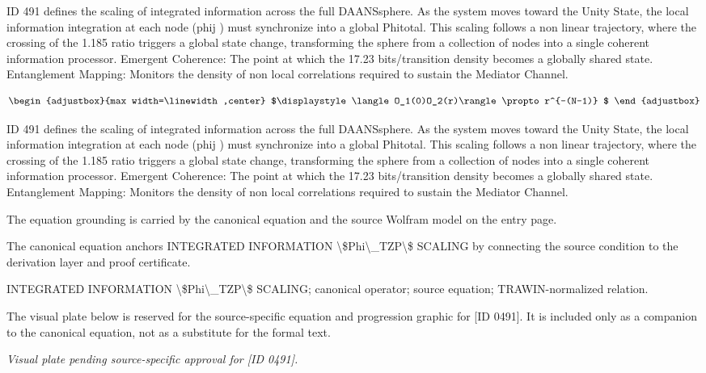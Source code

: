 ID 491 defines the scaling of integrated information across the full DAANSsphere. As the system moves toward the Unity State, the local information integration at each node (phij ) must synchronize into a global Phitotal. This scaling follows a non linear trajectory, where the crossing of the 1.185 ratio triggers a global state change, transforming the sphere from a collection of nodes into a single coherent information processor. Emergent Coherence: The point at which the 17.23 bits/transition density becomes a globally shared state. Entanglement Mapping: Monitors the density of non local correlations required to sustain the Mediator Channel.

\[
\begin{adjustbox}{max width=\linewidth,center}
$\displaystyle
\langle O_1(0)O_2(r)\rangle\propto r^{-(N-1)}
$
\end{adjustbox}
\]

ID 491 defines the scaling of integrated information across the full DAANSsphere. As the system moves toward the Unity State, the local information integration at each node (phij ) must synchronize into a global Phitotal. This scaling follows a non linear trajectory, where the crossing of the 1.185 ratio triggers a global state change, transforming the sphere from a collection of nodes into a single coherent information processor. Emergent Coherence: The point at which the 17.23 bits/transition density becomes a globally shared state. Entanglement Mapping: Monitors the density of non local correlations required to sustain the Mediator Channel.

The equation grounding is carried by the canonical equation and the source Wolfram model on the entry page.

The canonical equation anchors INTEGRATED INFORMATION \textbackslash{}\$Phi\textbackslash{}\_TZP\textbackslash{}\$ SCALING by connecting the source condition to the derivation layer and proof certificate.

INTEGRATED INFORMATION \textbackslash{}\$Phi\textbackslash{}\_TZP\textbackslash{}\$ SCALING; canonical operator; source equation; TRAWIN-normalized relation.
\endgroup

\begingroup\footnotesize\sloppy
The visual plate below is reserved for the source-specific equation and progression graphic for [ID 0491]. It is included only as a companion to the canonical equation, not as a substitute for the formal text.
\par\endgroup
\begingroup\footnotesize\itshape
Visual plate pending source-specific approval for [ID 0491].
\par\endgroup

